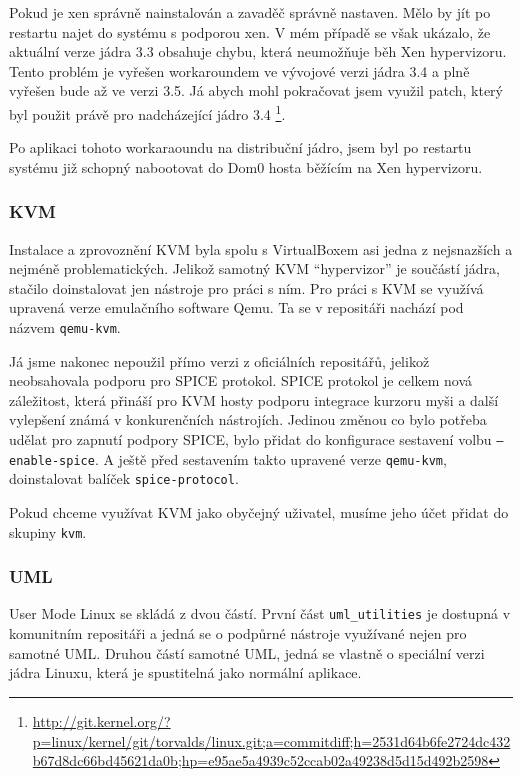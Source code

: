 Pokud je xen správně nainstalován a zavaděč správně nastaven. Mělo by jít po restartu najet do systému s podporou xen. V mém případě se však ukázalo, že aktuální verze jádra 3.3 obsahuje chybu, která neumožňuje běh Xen hypervizoru. Tento problém je vyřešen workaroundem ve vývojové verzi jádra 3.4 a plně vyřešen bude až ve verzi 3.5. Já abych mohl pokračovat jsem využil patch, který byl použit právě pro nadcházející jádro 3.4 \footnote{\url{http://git.kernel.org/?p=linux/kernel/git/torvalds/linux.git;a=commitdiff;h=2531d64b6fe2724dc432b67d8dc66bd45621da0b;hp=e95ae5a4939c52ccab02a49238d5d15d492b2598}}.

Po aplikaci tohoto workaraoundu na distribuční jádro, jsem byl po restartu systému již schopný nabootovat do Dom0 hosta běžícím na Xen hypervizoru.

\subsubsection{KVM}
Instalace a zprovoznění KVM byla spolu s VirtualBoxem asi jedna z nejsnazších a nejméně problematických. Jelikož samotný KVM "`hypervizor"' je součástí jádra, stačilo doinstalovat jen nástroje pro práci s ním. Pro práci s KVM se využívá upravená verze emulačního software Qemu. Ta se v repositáři nachází pod názvem \texttt{qemu-kvm}.

Já jsme nakonec nepoužil přímo verzi z oficiálních repositářů, jelikož neobsahovala podporu pro SPICE protokol. SPICE protokol je celkem nová záležitost, která přináší pro KVM hosty podporu integrace kurzoru myši a další vylepšení známá v konkurenčních nástrojích. Jedinou změnou co bylo potřeba udělat pro zapnutí podpory SPICE, bylo přidat do konfigurace sestavení volbu \texttt{---enable-spice}. A ještě před sestavením takto upravené verze \texttt{qemu-kvm}, doinstalovat balíček \texttt{spice-protocol}.

Pokud chceme využívat KVM jako obyčejný uživatel, musíme jeho účet přidat do skupiny \texttt{kvm}.

\subsubsection{UML}
User Mode Linux se skládá z dvou částí. První část \texttt{uml\_utilities} je dostupná v komunitním repositáři a jedná se o podpůrné nástroje využívané nejen pro samotné UML. Druhou částí samotné UML, jedná se vlastně o speciální verzi jádra Linuxu, která je spustitelná jako normální aplikace.

